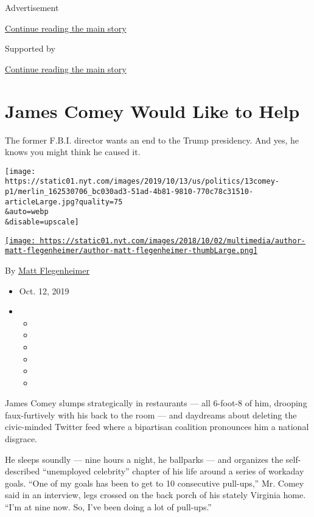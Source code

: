 Advertisement

\protect\hyperlink{after-top}{Continue reading the main story}

Supported by

\protect\hyperlink{after-sponsor}{Continue reading the main story}

\hypertarget{james-comey-would-like-to-help}{%
\section{James Comey Would Like to
Help}\label{james-comey-would-like-to-help}}

The former F.B.I. director wants an end to the Trump presidency. And
yes, he knows you might think he caused it.

\texttt{[image: https://static01.nyt.com/images/2019/10/13/us/politics/13comey-p1/merlin\_162530706\_bc030ad3-51ad-4b81-9810-770c78c31510-articleLarge.jpg?quality=75\\\&auto=webp\\\&disable=upscale]}

\href{https://www.nytimes.com/by/matt-flegenheimer}{\texttt{[image: https://static01.nyt.com/images/2018/10/02/multimedia/author-matt-flegenheimer/author-matt-flegenheimer-thumbLarge.png]}}

By \href{https://www.nytimes.com/by/matt-flegenheimer}{Matt
Flegenheimer}

\begin{itemize}
\item
  Oct. 12, 2019
\item
  \begin{itemize}
  \item
  \item
  \item
  \item
  \item
  \item
  \end{itemize}
\end{itemize}

James Comey slumps strategically in restaurants --- all 6-foot-8 of him,
drooping faux-furtively with his back to the room --- and daydreams
about deleting the civic-minded Twitter feed where a bipartisan
coalition pronounces him a national disgrace.

He sleeps soundly --- nine hours a night, he ballparks --- and organizes
the self-described ``unemployed celebrity'' chapter of his life around a
series of workaday goals. ``One of my goals has been to get to 10
consecutive pull-ups,'' Mr. Comey said in an interview, legs crossed on
the back porch of his stately Virginia home. ``I'm at nine now. So, I've
been doing a lot of pull-ups.''

